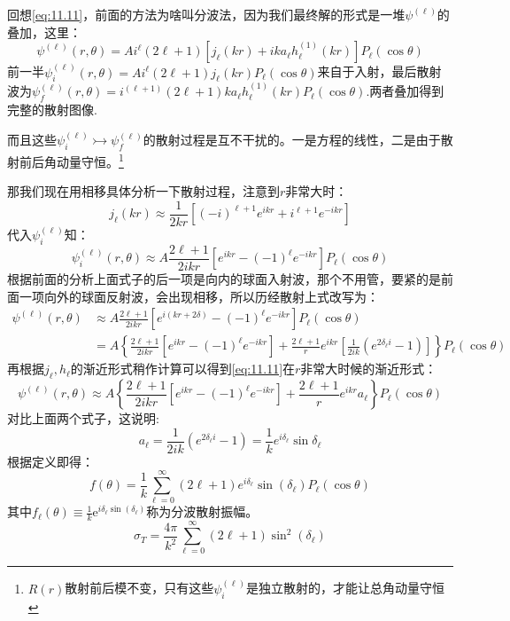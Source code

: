 \documentclass[a4paper,zihao=-4,linespread=1]{ctexrep}
\begin{document}
	回想\ref{eq:11.11}，前面的方法为啥叫分波法，因为我们最终解的形式是一堆$\psi^{(\ell)}$的叠加，这里：
	\[\psi^{(\ell)}(r,\theta)=A i^\ell(2\ell+1)\left[j_\ell(kr)+ika_\ell h^{(1)}_\ell(kr)\right]P_\ell(\cos\theta)\]
	前一半$\psi^{(\ell)}_i(r,\theta)=A i^\ell(2\ell+1)j_\ell(kr)P_\ell(\cos\theta)$来自于入射，最后散射波为$\psi^{(\ell)}_f(r,\theta)=i^{(\ell+1)}(2\ell+1)ka_\ell h^{(1)}_\ell(kr)P_\ell(\cos\theta)$.两者叠加得到完整的散射图像.
	
	而且这些$\psi^{(\ell)}_i\rightarrowtail\psi^{(\ell)}_f$的散射过程是互不干扰的。一是方程的线性，二是由于散射前后角动量守恒。\footnote{$R(r)$散射前后模不变，只有这些$\psi^{(\ell)}_i$是独立散射的，才能让总角动量守恒}
	
	那我们现在用相移具体分析一下散射过程，注意到$r$非常大时：
	$$j_\ell(kr)\approx \frac{1}{2kr}\left[(-i)^{\ell+1}e^{ikr}+i^{\ell+1}e^{-ikr}\right]$$
	代入$\psi^{(\ell)}_i$知：
	\[\psi^{(\ell)}_i(r,\theta)\approx A\frac{2\ell+1}{2ikr}\left[e^{ikr}-(-1)^\ell e^{-ikr}\right]P_\ell(\cos\theta)\]
	根据前面的分析上面式子的后一项是向内的球面入射波，那个不用管，要紧的是前面一项向外的球面反射波，会出现相移，所以历经散射上式改写为：
	\begin{equation}
		\begin{aligned}
		\psi^{(\ell)}(r,\theta)&\approx A\frac{2\ell+1}{2ikr}\left[e^{i(kr+2\delta)}-(-1)^\ell e^{-ikr}\right]P_\ell(\cos\theta)\\
		&=A\left\{\frac{2\ell+1}{2ikr}\left[e^{ikr}-(-1)^\ell e^{-ikr}\right]+\frac{2\ell+1}{r}e^{ikr}\left[\frac{1}{2ik}(e^{2\delta_\ell i}-1)\right]\right\}P_\ell(\cos\theta)
		\end{aligned}
	\end{equation}	
	再根据$j_\ell,h_\ell$的渐近形式稍作计算可以得到\ref{eq:11.11}在$r$非常大时候的渐近形式：
	\[\psi^{(\ell)}(r,\theta)\approx A\left\{\frac{2\ell+1}{2ikr}\left[e^{ikr}-(-1)^\ell e^{-ikr}\right]+\frac{2\ell+1}{r}e^{ikr}a_\ell\right\}P_\ell(\cos\theta)\]
	对比上面两个式子，这说明:
	\begin{equation}
		a_\ell=\frac{1}{2ik}(e^{2\delta_\ell i}-1)=\frac{1}{k}e^{i\delta_\ell}\sin\delta_\ell
	\end{equation}
	根据定义即得：
	\begin{equation}
		\label{eq:11.14}
		f(\theta)=\frac{1}{k} \sum_{\ell=0}^{\infty}(2 \ell+1) e^{i \delta_{\ell}} \sin \left(\delta_{\ell}\right) P_{\ell}(\cos \theta)
	\end{equation}
	其中$f_\ell(\theta)\equiv\frac{1}{k}\mathrm{e}^{i\delta_\ell\sin(\delta_\ell)}$称为分波散射振幅。
	\begin{equation}
		\label{eq:11.15}
		\sigma_T=\frac{4 \pi}{k^{2}} \sum_{\ell=0}^{\infty}(2 \ell+1) \sin ^{2}\left(\delta_{\ell}\right) 
	\end{equation}
	
\end{document}
